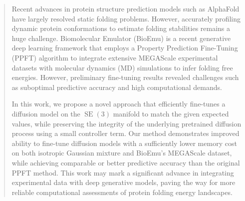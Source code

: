 \documentclass{article}
\theoremstyle{plain}
\theoremstyle{definition}
\theoremstyle{remark}
\DeclareMathOperator{\SE}{SE}
\begin{document}

\printAffiliationsAndNotice{\icmlEqualContribution} %

\begin{abstract}
    Recent advances in protein structure prediction models such as AlphaFold have largely resolved static folding problems. However, accurately profiling dynamic protein conformations to estimate folding stabilities remains a huge challenge.
    Biomolecular Emulator (BioEmu) is a recent generative deep learning framework that employs a Property Prediction Fine-Tuning (PPFT) algorithm to integrate extensive MEGAScale experimental datasets with molecular dynamics (MD) simulations to infer folding free energies. However, preliminary fine-tuning results revealed challenges such as suboptimal predictive accuracy and high computational demands.

    In this work, we propose a novel approach that efficiently fine-tunes a diffusion model on the $\SE(3)$ manifold to match the given expected values, while preserving the integrity of the underlying pretrained diffusion process using a small controller term. Our method demonstrates improved ability to fine-tune diffusion models with a sufficiently lower memory cost on both isotropic Gaussian mixture and BioEmu's MEGAScale dataset, while achieving comparable or better predictive accuracy than the original PPFT method. This work may mark a significant advance in integrating experimental data with deep generative models, paving the way for more reliable computational assessments of protein folding energy landscapes.
\end{abstract}
\end{document}
